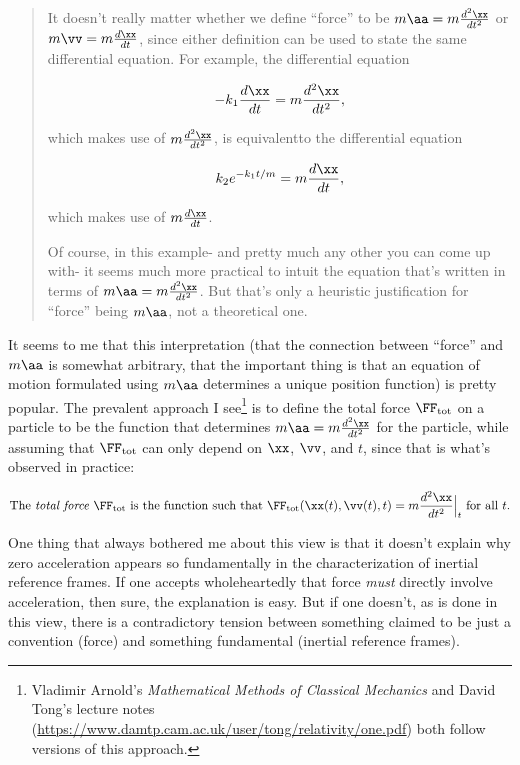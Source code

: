 \documentclass{article}
\begin{document}
\begin{quote}
    It doesn't really matter whether we define ``force'' to be $m\aa = m\frac{d^2\xx}{dt^2}$ or $m\vv = m \frac{d\xx}{dt}$, since either definition can be used to state the same differential equation. For example, the differential equation

    \begin{align*}
        -k_1 \frac{d\xx}{dt} = m\frac{d^2\xx}{dt^2},
    \end{align*}

    which makes use of $m \frac{d^2\xx}{dt^2}$, is equivalent\footnotemark to the differential equation

    \begin{align*}
        k_2 e^{-k_1 t/m} = m\frac{d\xx}{dt},
    \end{align*}

    which makes use of $m \frac{d\xx}{dt}$.

    Of course, in this example- and pretty much any other you can come up with- it seems much more practical to intuit the equation that's written in terms of $m \aa = m \frac{d^2\xx}{dt^2}$. But that's only a heuristic justification for ``force'' being $m\aa$, not a theoretical one.
\end{quote}


It seems to me that this interpretation (that the connection between ``force'' and $m\aa$ is somewhat arbitrary, that the important thing is that an equation of motion formulated using $m\aa$ determines a unique position function) is pretty popular. The prevalent approach I see\footnote{Vladimir Arnold's \textit{Mathematical Methods of Classical Mechanics} and David Tong's lecture notes (\url{https://www.damtp.cam.ac.uk/user/tong/relativity/one.pdf}) both follow versions of this approach.} is to define the total force $\FF_{\text{tot}}$ on a particle to be the function that determines $m\aa = m \frac{d^2\xx}{dt^2}$ for the particle, while assuming that $\FF_{\text{tot}}$ can only depend on $\xx$, $\vv$, and $t$, since that is what's observed in practice:

\begin{align*}
    \text{The \textit{total force} $\FF_{\text{tot}}$ is the function such that } \FF_{\text{tot}}(\xx(t), \vv(t), t) = m \frac{d^2\xx}{dt^2}\Big|_t \text{ for all $t$}.
\end{align*}

One thing that always bothered me about this view is that it doesn't explain why zero acceleration appears so fundamentally in the characterization of inertial reference frames. If one accepts wholeheartedly that force \textit{must} directly involve acceleration, then sure, the explanation is easy. But if one doesn't, as is done in this view, there is a contradictory tension between something claimed to be just a convention (force) and something fundamental (inertial reference frames).
\end{document}
